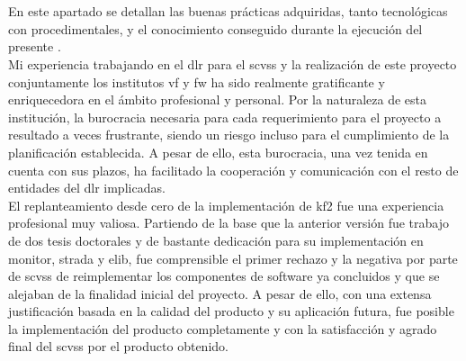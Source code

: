 \begin{comment}

Simpleza de codigo kf vs kf2, en líneas y en ficheros
configuración para las distintas instancias a través de ficheros externos

sistema más adaptable a un posible cambio de tegnologias pe django como backenD?! easy! MVC
mejora de la performance
mejora performance en la importacion

nuevas tenconologias hmtl5, ... el futuro!

facil configuración para cambiar los datos
\end{comment}

\section{}

En este apartado se detallan las buenas prácticas adquiridas, tanto tecnológicas con procedimentales, y el conocimiento conseguido durante la ejecución del presente \pfc{}.\\

Mi experiencia trabajando en el \gls{dlr} para el \gls{scvss} y la realización de este proyecto conjuntamente los institutos \gls{vf} y \gls{fw} ha sido realmente gratificante y enriquecedora en el ámbito profesional y personal. Por la naturaleza de esta institución, la burocracia necesaria para cada requerimiento para el proyecto a resultado a veces frustrante, siendo un riesgo incluso para el cumplimiento de la planificación establecida. A pesar de ello, esta burocracia, una vez tenida en cuenta con sus plazos, ha facilitado la cooperación y comunicación con el resto de entidades del \gls{dlr} implicadas.\\

El replanteamiento desde cero de la implementación de \gls{kf2} fue una experiencia profesional muy valiosa. Partiendo de la base que  la anterior versión fue trabajo de dos tesis doctorales y de bastante dedicación para su implementación en \gls{monitor}, \gls{strada} y \gls{elib}, fue comprensible el primer rechazo y la negativa por parte de \gls{scvss} de reimplementar los componentes de \gls{software} ya concluidos y que se alejaban de la finalidad inicial del proyecto. A pesar de ello, con una extensa justificación basada en la calidad del producto y su aplicación futura, fue posible la implementación del producto completamente y con la satisfacción y agrado final del \gls{scvss} por el producto obtenido.\\

